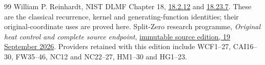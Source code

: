 \documentclass[11pt]{article}
\theoremstyle{remark}\newtheorem{remark}[theorem]{Remark}
\begin{document}
\begin{thebibliography}{99}
William P. Reinhardt, NIST DLMF Chapter 18,
\href{https://dlmf.nist.gov/18.2.E12}{18.2.12} and
\href{https://dlmf.nist.gov/18.23.E7}{18.23.7}.
These are the classical recurrence, kernel and generating-function
identities; their original-coordinate uses are proved here.
 Split-Zero research programme,
\emph{Original heat control and complete source endpoint},
\href{https://github.com/KokunoYumeto/zeta-function-research-reader/tree/1445091fd84d47b3908f56d4db1f8a28acd134da/workbenches/splitzero-tandem/continuations/20260919-original-heat-source-endpoint}{immutable source edition, 19 September 2026}.
Providers retained with this edition include WCF1--27, CAI16--30,
FW35--46, NC12 and NC22--27, HM1--30 and HG1--23.
\end{thebibliography}
\end{document}
